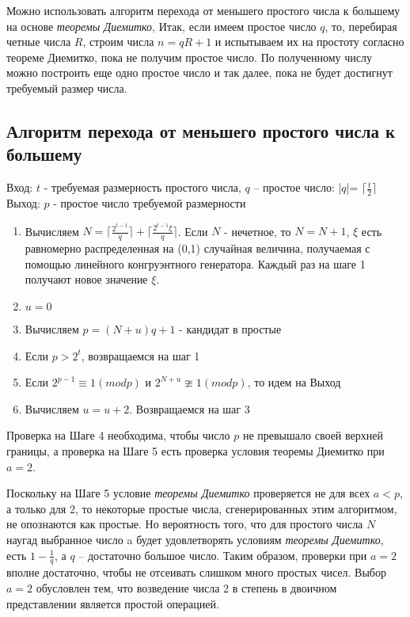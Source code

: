   Можно использовать алгоритм перехода от меньшего простого числа к большему на основе \textit{теоремы Диемитко},
  Итак, если имеем простое число {$q$}, то, перебирая четные числа {$R$}, строим числа {$n = q R + 1$} и испытываем их на 
  простоту согласно теореме Диемитко, пока не получим простое число. По полученному числу можно построить еще одно простое число и так далее,
  пока не будет достигнут требуемый размер числа. 

  
  \subsection{Алгоритм перехода от меньшего простого числа к большему}
    Вход: {$t$} - требуемая размерность простого числа, {$q$} – простое число: |{$q$}|= {$\lceil \frac{t}{2} \rceil$}
    Выход: {$p$} - простое число требуемой размерности
    
      \begin{enumerate}
	\item Вычисляем {$N = \lceil \frac{2^{ t - 1}}{q} \rceil + \lceil \frac{2^{ t - 1} \xi}{q} \rceil$}. 
	Если {$N$} - нечетное, то {$N = N + 1$}, {$\xi$} есть равномерно распределенная на (0,1) случайная величина, получаемая с помощью 
	линейного конгруэнтного генератора. Каждый раз на шаге 1 получают новое значение {$\xi$}.
	\item {$u = 0$}
	\item Вычисляем {$p = (N + u)q + 1$} - кандидат в простые
	\item Если {$p > 2^{ t}$}, возвращаемся на шаг 1
	\item Если {$2^{ p - 1} \equiv 1(mod p)$} и {$2^{ N+u} \ncong 1(mod p)$}, то идем на Выход
	\item Вычисляем {$u = u + 2$}. Возвращаемся на шаг 3
      \end{enumerate}
      
      Проверка на Шаге 4 необходима, чтобы число {$p$} не превышало своей верхней границы, а проверка на Шаге 5 есть проверка условия 
      теоремы Диемитко при {$a=2$}. 
      
      Поскольку на Шаге 5 условие \textit{теоремы Диемитко} проверяется не для всех {$a<p$}, а только для 2, то некоторые простые числа, 
      сгенерированных этим алгоритмом, не опознаются как простые. Но вероятность того, что для простого числа {$N$} наугад выбранное 
      число a будет удовлетворять условиям \textit{теоремы Диемитко}, есть {$1 - \frac{1}{q}$}, а {$q$} – достаточно большое число. Таким образом, проверки
      при {$a=2$} вполне достаточно, чтобы не отсеивать слишком много простых чисел. Выбор {$a=2$} обусловлен тем, что возведение числа 2 
      в степень в двоичном представлении является простой операцией.
      
